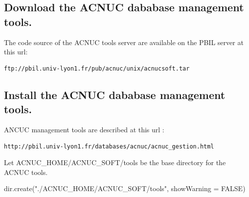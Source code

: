 \documentclass{article}
\begin{document}
\subsection{Download the ACNUC dababase management tools.}
 
 
 
 
 The code source of the ACNUC tools server are available on the PBIL server  at this url:
\begin{verbatim}
ftp://pbil.univ-lyon1.fr/pub/acnuc/unix/acnucsoft.tar
\end{verbatim}

\subsection{Install the ACNUC dababase management tools.}
ANCUC management tools are described at this url :
\begin{verbatim}
http://pbil.univ-lyon1.fr/databases/acnuc/acnuc_gestion.html
\end{verbatim}

Let ACNUC\_HOME/ACNUC\_SOFT/tools be the base directory for the ACNUC tools.


\begin{Schunk}
\begin{Sinput}
 dir.create("./ACNUC_HOME/ACNUC_SOFT/tools", showWarning = FALSE)
\end{Sinput}
\end{Schunk}
\end{document}
